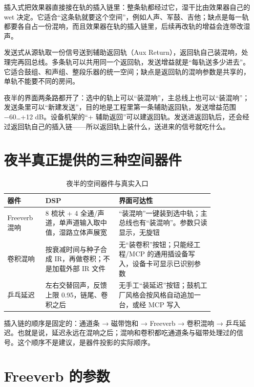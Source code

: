 插入式把效果器直接接在轨的插入链里：整条轨都经过它，湿干比由效果器自己的 wet 决定。它适合“这条轨就要这个空间”，例如人声、军鼓、吉他；缺点是每一轨都要各自占一份混响，而且效果器在轨的插入链里，后续再改轨的增益会连带改湿声。

发送式从源轨取一份信号送到辅助返回轨（Aux Return），返回轨自己装混响，处理完再回总线。多条轨可以共用同一个返回轨，发送增益就是“每轨送多少进去”。它适合鼓组、和声组、整段乐器的统一空间；缺点是返回轨的混响参数是共享的，单轨不能要不同的房间。

夜半的界面两条路都开了：选中的轨上可以“装混响”，主总线上也可以“装混响”；发送条里可以“新建发送”，目的地是工程里第一条辅助返回轨，发送增益范围 −60…+12 dB。设备机架的“+ 辅助返回”可以建返回轨。发送进返回轨后，还会经过返回轨自己的插入链——所以返回轨上装什么，送进来的信号就吃什么。

\section{夜半真正提供的三种空间器件}

\begin{table}[htbp]
\centering
\small
\begin{tabular}{@{}p{0.15\linewidth}p{0.30\linewidth}p{0.39\linewidth}@{}}
\hline
器件 & DSP & 界面可达性 \\
\hline
Freeverb 混响 & 8 梳状 + 4 全通/声道，单声道输入取中值，湿路立体声展宽 & “装混响”一键装到选中轨；主总线也有“装混响”。参数只读显示，无旋钮 \\
卷积混响 & 按衰减时间与种子合成 IR，再做卷积；不是加载外部 IR 文件 & 无“装卷积”按钮；只能经工程/MCP 的通用插设备写入，设备卡可显示已识别参数 \\
乒乓延迟 & 左右交替回声，反馈上限 0.95，链尾、卷积之后 & 无手工“装延迟”按钮；鼓机工厂风格会按风格自动追加一台，或经 MCP 写入 \\
\hline
\end{tabular}
\caption{夜半的空间器件与真实入口}
\label{tab:space-devices}
\end{table}

插入链的顺序是固定的：通道条 → 磁带饱和 → Freeverb → 卷积混响 → 乒乓延迟。也就是说，延迟永远在混响之后；混响和卷积都吃通道条与磁带处理过的信号。这个顺序不是建议，是器件投影的实际顺序。

\section{Freeverb 的参数}

